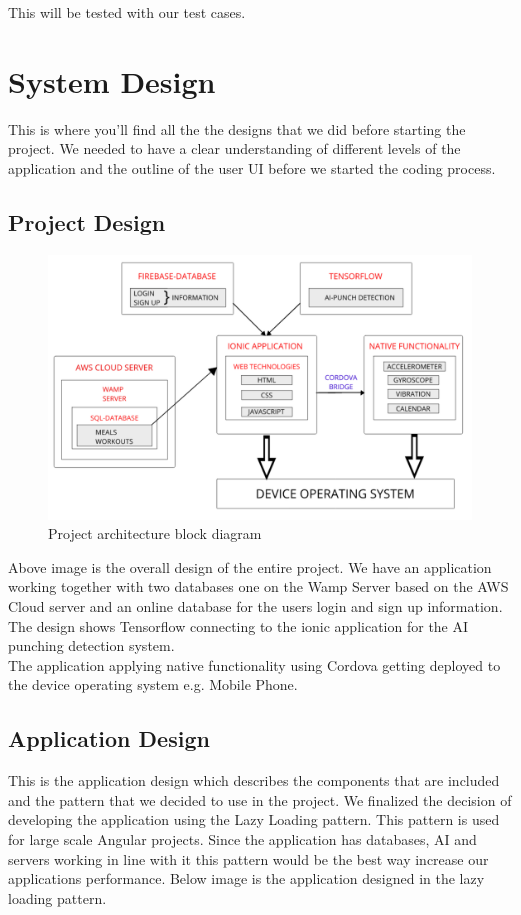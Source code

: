 \documentclass[a4paper,12pt]{report}
\begin{document}
This will be tested with our test cases.

\chapter{System Design}
This is where you’ll find all the the designs that we did before starting the project. We needed to have a clear understanding of different levels of the application and the outline of the user UI before we started the coding process.

\section{Project Design}
\begin{figure}[h]
\includegraphics[scale=.37]{images/projectOverview.png}
\caption{Project architecture block diagram}
\label{fig:projectDiagram}
\end{figure}

Above image is the overall design of the entire project. We have an application working together with two databases one on the Wamp Server based on the AWS Cloud server and an online database for the users login and sign up information.\\
The design shows Tensorflow connecting to the ionic application for the AI punching detection system.\\
The application applying native functionality using Cordova getting deployed to the device operating system e.g. Mobile Phone. 
\section{Application Design}
This is the application design which describes the components that are included and the pattern that we decided to use in the project.
We finalized the decision of developing the application using the Lazy Loading pattern. This pattern is used for large scale Angular projects.
Since the application has databases, AI and servers working in line with it this pattern would be the best way increase our applications performance.
Below image is the application designed in the lazy loading pattern.
\end{document}

